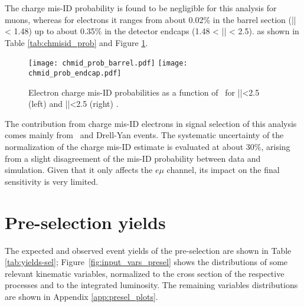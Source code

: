 The charge mis-ID probability is found to be negligible for this analysis for muons, whereas for
electrons it ranges from about 0.02\% in the barrel section (|\etac| < 1.48) up to about 0.35\% in the detector endcaps (1.48 < |\etac| < 2.5). as shown in Table \ref{tab:chmisid_prob} and Figure \ref{fig:chmisid_prob}.

\begin{figure}[htp]
\centering
\texttt{[image: chmid\_prob\_barrel.pdf]}
\texttt{[image: chmid\_prob\_endcap.pdf]}
\caption[Elecron mis-ID probabilities.]{Electron charge mis-ID probabilities as a function of \pt\ for |\etac|<2.5 (left) and |\etac|<2.5 (right) \cite{CMS_AN_2017-029}.}
\label{fig:chmisid_prob}
\end{figure}                            

The contribution from charge mis-ID electrons in signal selection of this analysis comes mainly from \ttbar\ and Drell-Yan events. The systematic uncertainty of the normalization of the charge mis-ID estimate is evaluated at about 30\%, arising from a slight disagreement of the mis-ID probability between data and simulation. Given that it only affects the $e\mu$ channel, its impact on the final sensitivity is very limited.

\section{Pre-selection yields}

The expected and observed event yields of the pre-selection are shown in Table \ref{tab:yields-sel}; Figure~\ref{fig:input_vars_presel} shows the distributions of some relevant kinematic variables, normalized to the cross section of the respective processes and to the integrated luminosity. The remaining variables distributions are shown in Appendix \ref{app:presel_plots}. 

